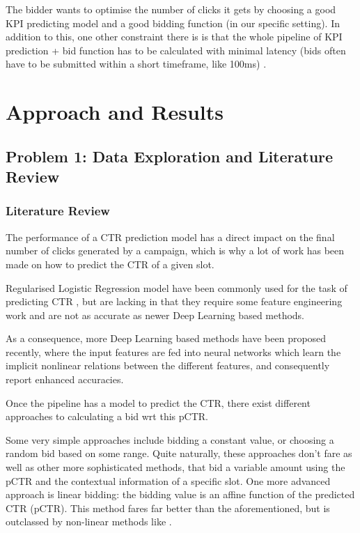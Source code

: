 \documentclass{sig-alternate-05-2015}
\begin{document}
The bidder wants to optimise the number of clicks it gets by choosing a good KPI predicting model and a good bidding function (in our specific setting).
In addition to this, one other constraint there is is that the whole pipeline of KPI prediction + bid function has to be calculated with minimal latency (bids often have to be submitted within a short timeframe, like 100ms) \cite{MILLI, PHD1}.


\section{Approach and Results}

\subsection{Problem 1: Data Exploration and Literature Review}

\subsubsection{Literature Review}


The performance of a CTR prediction model has a direct impact on the final number of clicks generated by a campaign,
which is why a lot of work has been made on how to predict the CTR of a given slot.

Regularised Logistic Regression model have been commonly used for the task of predicting CTR \cite{LOGREG1}, but are lacking in that they require some feature engineering work and are not as accurate as newer Deep Learning based methods. \cite{DL1}

As a consequence, more Deep Learning based methods have been proposed recently, where the input features are fed into neural networks which learn the implicit nonlinear relations between the different features, and consequently report enhanced accuracies. \cite{DL2, DL3, DL5} 

Once the pipeline has a model to predict the CTR, there exist different approaches to calculating a bid wrt this pCTR.



Some very simple approaches include bidding a constant value, or choosing a random bid based on some range.
Quite naturally, these approaches don't fare as well as other more sophisticated methods, that bid a variable amount using the pCTR and the contextual information of a specific slot.  \cite{ORTB}
One more advanced approach is linear bidding: the bidding value is an affine function of the predicted CTR (pCTR).
This method fares far better than the aforementioned, but is outclassed by non-linear methods like \cite{ORTB}.
\end{document}
